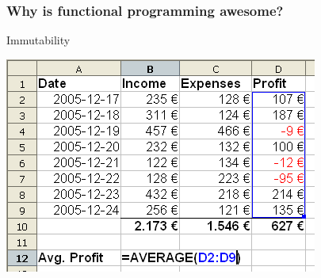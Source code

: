\documentclass[12pt, xcolor=table]{beamer}
\begin{document}

\begin{frame}
    \frametitle{Why is functional programming awesome?}
    \begin{block}{Immutability}
        \begin{center}
            \includegraphics[scale=0.4]{figures/Spreadsheet.png}
        \end{center}
    \end{block}
\end{frame}
\end{document}
